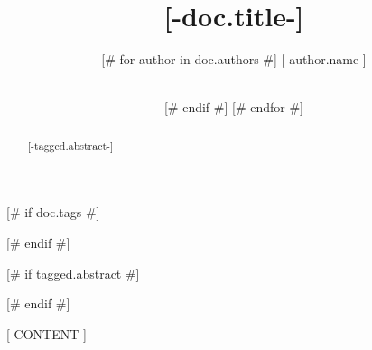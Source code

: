 \documentclass{article}
\title{[-doc.title-]}
\date{\displaydate{articleDate}}
\author{[# for author in doc.authors #]
[-author.name-]\\
[-author.affiliation-]\\
[# if not loop.last #]
\and
[# endif #]
[# endfor #]
}
\begin{document}
\maketitle

[# if doc.tags #]

[# endif #]

[# if tagged.abstract #]
\begin{abstract}
  [-tagged.abstract-]
\end{abstract}

[# endif #]


[-CONTENT-]



\end{document}
